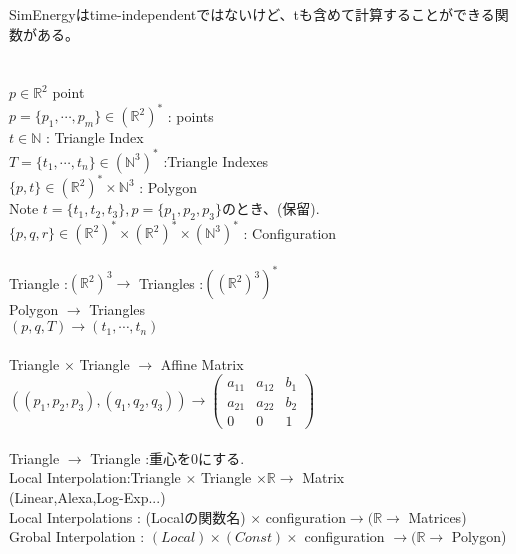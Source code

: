 \documentclass[8pt]{article}
\begin{document}
SimEnergyはtime-independentではないけど、tも含めて計算することができる関数がある。\\
\\
\noindent
[2016.10.17追記]\\
$p \in \mathbb{R}^2$  point\\
$p = \{ p_1 , \cdots, p_m \} \in ( \mathbb{R}^2 )^* $ : points\\
$t \in \mathbb{N}$ : Triangle Index\\
$T = \{ t_1, \cdots , t_n \} \in ( \mathbb{N}^3 )^*$ :Triangle Indexes\\
$ \{p , t \} \in ( \mathbb{R}^2 )^* \times \mathbb{N}^3$ : Polygon\\
Note $t = \{ t_1 , t_2 , t_3 \} ,p = \{p_1,p_2,p_3 \} $のとき、(保留).\\
$ \{p,q,r \} \in (\mathbb{R}^2)^* \times (\mathbb{R}^2)^* \times (\mathbb{N}^3)^*$ : Configuration\\
\\
\noindent 
Triangle :$ (\mathbb{R}^2)^3 \rightarrow $ Triangles :$(( \mathbb{R}^2)^3)^*$\\
Polygon $\rightarrow $ Triangles\\
$( p, q, T ) \rightarrow (t_1, \cdots ,t_n)$\\
\\
\noindent
Triangle $ \times$ Triangle $\rightarrow$ Affine Matrix\\
$
((p_1 , p_2 , p_3) , (q_1 , q_2 , q_3)) \rightarrow 
\left(
    \begin{array}{ccc}
      a_{11} & a_{12} & b_1 \\
      a_{21} & a_{22} & b_2 \\
      0 & 0 & 1
    \end{array}
  \right)$\\
\\
\noindent
Triangle $\rightarrow$ Triangle :重心を0にする.\\
Local Interpolation:Triangle $ \times $ Triangle $ \times \mathbb{R} \rightarrow $ Matrix\\(Linear,Alexa,Log-Exp...)\\
Local Interpolations : (Localの関数名) $ \times $ configuration$ \rightarrow (\mathbb{R} \rightarrow $ Matrices)\\
Grobal Interpolation : $(Local) \times (Const) \times$ configuration $\rightarrow ( \mathbb{R} \rightarrow$ Polygon)\\


\nocite{Igarashi2005,Igarashi2009,Werman1995}


\end{document}
